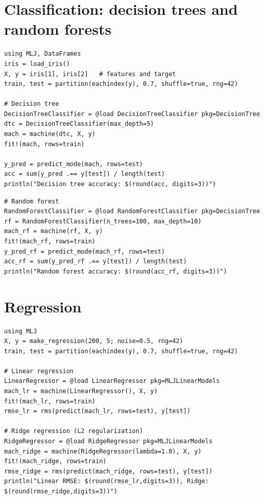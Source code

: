 \section{Classification: decision trees and random forests}

\begin{verbatim}
using MLJ, DataFrames
iris = load_iris()
X, y = iris[1], iris[2]   # features and target
train, test = partition(eachindex(y), 0.7, shuffle=true, rng=42)

# Decision tree
DecisionTreeClassifier = @load DecisionTreeClassifier pkg=DecisionTree
dtc = DecisionTreeClassifier(max_depth=5)
mach = machine(dtc, X, y)
fit!(mach, rows=train)

y_pred = predict_mode(mach, rows=test)
acc = sum(y_pred .== y[test]) / length(test)
println("Decision tree accuracy: $(round(acc, digits=3))")
\end{verbatim}

\begin{verbatim}
# Random forest
RandomForestClassifier = @load RandomForestClassifier pkg=DecisionTree
rf = RandomForestClassifier(n_trees=100, max_depth=10)
mach_rf = machine(rf, X, y)
fit!(mach_rf, rows=train)
y_pred_rf = predict_mode(mach_rf, rows=test)
acc_rf = sum(y_pred_rf .== y[test]) / length(test)
println("Random forest accuracy: $(round(acc_rf, digits=3))")
\end{verbatim}

\section{Regression}

\begin{verbatim}
using MLJ
X, y = make_regression(200, 5; noise=0.5, rng=42)
train, test = partition(eachindex(y), 0.7, shuffle=true, rng=42)

# Linear regression
LinearRegressor = @load LinearRegressor pkg=MLJLinearModels
mach_lr = machine(LinearRegressor(), X, y)
fit!(mach_lr, rows=train)
rmse_lr = rms(predict(mach_lr, rows=test), y[test])

# Ridge regression (L2 regularization)
RidgeRegressor = @load RidgeRegressor pkg=MLJLinearModels
mach_ridge = machine(RidgeRegressor(lambda=1.0), X, y)
fit!(mach_ridge, rows=train)
rmse_ridge = rms(predict(mach_ridge, rows=test), y[test])
println("Linear RMSE: $(round(rmse_lr,digits=3)), Ridge: $(round(rmse_ridge,digits=3))")
\end{verbatim}

